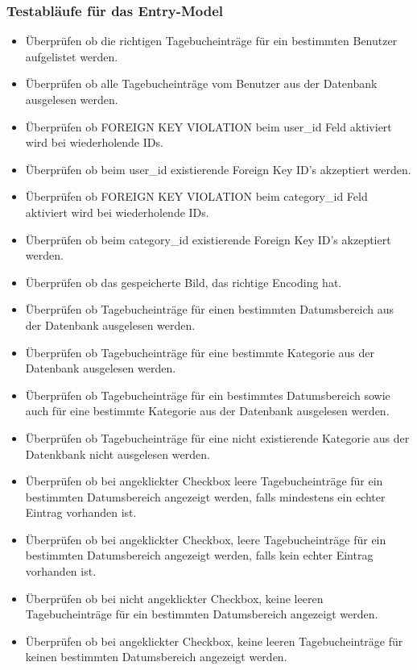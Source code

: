 \subsubsection*{Testabläufe für das Entry-Model}
\begin{itemize}
  \item Überprüfen ob die richtigen Tagebucheinträge für ein bestimmten Benutzer aufgelistet werden.
  \item Überprüfen ob alle Tagebucheinträge vom Benutzer aus der Datenbank ausgelesen werden.
  \item Überprüfen ob FOREIGN KEY VIOLATION beim user\_id Feld aktiviert wird bei wiederholende IDs.
  \item Überprüfen ob beim user\_id existierende Foreign Key ID's akzeptiert werden.
  \item Überprüfen ob FOREIGN KEY VIOLATION beim category\_id Feld aktiviert wird bei wiederholende IDs.
  \item Überprüfen ob beim category\_id existierende Foreign Key ID's akzeptiert werden.
  \item Überprüfen ob das gespeicherte Bild, das richtige Encoding hat.
  \item Überprüfen ob Tagebucheinträge für einen bestimmten Datumsbereich aus der Datenbank ausgelesen werden.
  \item Überprüfen ob Tagebucheinträge für eine bestimmte Kategorie aus der Datenbank ausgelesen werden.
  \item Überprüfen ob Tagebucheinträge für ein bestimmtes Datumsbereich sowie auch für eine bestimmte Kategorie aus der Datenbank ausgelesen werden.
  \item Überprüfen ob Tagebucheinträge für eine nicht existierende Kategorie aus der Datenkbank nicht ausgelesen werden.
  \item Überprüfen ob bei angeklickter Checkbox leere Tagebucheinträge für ein bestimmten Datumsbereich angezeigt werden, falls mindestens ein echter Eintrag vorhanden ist.
  \item Überprüfen ob bei angeklickter Checkbox, leere Tagebucheinträge für ein bestimmten Datumsbereich angezeigt werden, falls kein echter Eintrag vorhanden ist.
  \item Überprüfen ob bei nicht angeklickter Checkbox, keine leeren Tagebucheinträge für ein bestimmten Datumsbereich angezeigt werden.
  \item Überprüfen ob bei angeklickter Checkbox, keine leeren Tagebucheinträge für keinen bestimmten Datumsbereich angezeigt werden.
\end{itemize}

